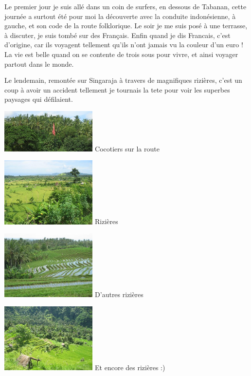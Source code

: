 \begin{multicols}{2}
Le premier jour je suis allé dans un coin de surfers, en dessous de Tabanan, cette journée a surtout été pour moi la découverte avec la conduite indonésienne, à gauche, et son code de la route folklorique. Le soir je me suis posé à une terrasse, à discuter, je suis tombé sur des Français. Enfin quand je dis Francais, c'est d'origine, car ils voyagent tellement qu'ils n'ont jamais vu la couleur d'un euro ! La vie est belle quand on se contente de trois sous pour vivre, et ainsi voyager partout dans le monde.

Le lendemain, remontée sur Singaraja à travers de magnifiques rizières, c'est un coup à avoir un accident tellement je tournais la tete pour voir les superbes paysages qui défilaient.

\hspace*{-0.65cm}
\includegraphics[width=4.8cm]{articles/Round-trip-in-bali/1208257309URc4.jpg}
Cocotiers sur la route


\hspace*{-0.65cm}
\includegraphics[width=4.8cm]{articles/Round-trip-in-bali/1208257304SP22.jpg}
Rizières


\hspace*{-0.65cm}
\includegraphics[width=4.8cm]{articles/Round-trip-in-bali/1208257308isJF.jpg}
D'autres rizières


\hspace*{-0.65cm}
\includegraphics[width=4.8cm]{articles/Round-trip-in-bali/1208257307G9b6.jpg}
Et encore des rizières :)



\end{multicols}
